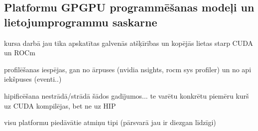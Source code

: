 \begin{center}
    \chapter{Platformu GPGPU programmēšanas modeļi un lietojumprogrammu
    saskarne}
\end{center}


kursa darbā jau tika apskatītas galvenās atšķīrības un kopējās lietas starp
CUDA un ROCm

profilēšanas iespējas, gan no ārpuses (nvidia nsights, rocm sys profiler) un 
no api iekšpuses (eventi..)


hipificēšana nestrādā/strādā šādos gadījumos...
te varētu konkrētu piemēru kurš uz CUDA kompilējas, bet ne uz HIP 

visu platformu piedāvātie atmiņu tipi (pārsvarā jau ir diezgan līdzīgi)


